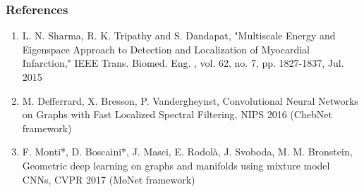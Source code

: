 \documentclass{beamer}
\begin{document}
\begin{frame}
  \frametitle{References}
  \begin{enumerate}
  \item L. N. Sharma, R. K. Tripathy and S. Dandapat, "Multiscale Energy and Eigenspace Approach to Detection and Localization of Myocardial Infarction," IEEE Trans. Biomed. Eng. , vol. 62, no. 7, pp. 1827-1837, Jul. 2015
  \item M. Defferrard, X. Bresson, P. Vandergheynst, Convolutional Neural Networks on Graphs with Fast Localized Spectral Filtering, NIPS 2016 (ChebNet framework)
  \item F. Monti*, D. Boscaini*, J. Masci, E. Rodolà, J. Svoboda, M. M. Bronstein, Geometric deep learning on graphs and manifolds using mixture model CNNs, CVPR 2017 (MoNet framework)
  \end{enumerate}

\end{frame}
\end{document}
